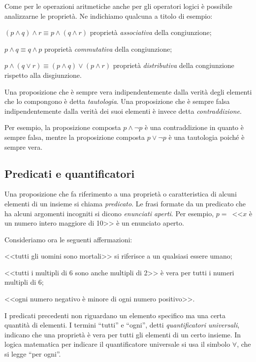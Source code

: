 Come per le operazioni aritmetiche anche per gli operatori logici è possibile analizzarne le proprietà. Ne indichiamo qualcuna a titolo di esempio:
\begin{itemize*}
\item $(p\wedge q)\wedge r\equiv p\wedge (q\wedge r)$ proprietà \emph{associativa} della congiunzione;
\item $p\wedge q\equiv q\wedge p$ proprietà \emph{commutativa} della congiunzione;
\item $p\wedge (q\vee r)\equiv (p\wedge q)\vee (p\wedge r)$ proprietà \emph{distributiva} della congiunzione rispetto alla disgiunzione.
\end{itemize*}

Una proposizione che è sempre vera indipendentemente dalla verità degli elementi che lo compongono è detta \emph{tautologia}. Una proposizione che è sempre falsa indipendentemente dalla verità dei suoi elementi è invece detta \emph{contraddizione}.

Per esempio, la proposizione composta $p\wedge \neg p$ è una contraddizione in quanto è sempre falsa, mentre la proposizione composta $p\vee \neg p$ è una tautologia poiché è sempre vera.

\subsection{Predicati e quantificatori}

Una proposizione che fa riferimento a una proprietà o caratteristica di alcuni elementi di un insieme si chiama \emph{predicato}. Le frasi formate da un predicato che ha alcuni argomenti incogniti si dicono \emph{enunciati aperti}.
Per esempio, $p=$~<<$x$ è un numero intero maggiore di 10>> è un enunciato aperto.

Consideriamo ora le seguenti affermazioni:
\begin{itemize*}
\item <<tutti gli uomini sono mortali>> si riferisce a un qualsiasi essere umano;
\item <<tutti i multipli di 6 sono anche multipli di 2>> è vera per tutti i numeri multipli di 6;
\item <<ogni numero negativo è minore di ogni numero positivo>>.
\end{itemize*}
I predicati precedenti non riguardano un elemento specifico ma una certa quantità di elementi. I termini ``tutti'' e ``ogni'', detti \emph{quantificatori universali}, indicano che una proprietà è vera per tutti gli elementi di un certo insieme. In logica matematica per indicare il quantificatore universale si usa il simbolo $\forall$, che si legge ``per ogni''.

